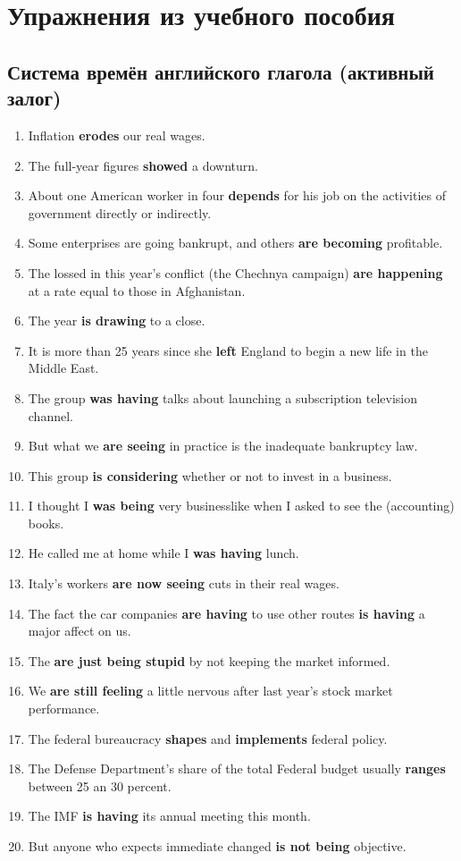 \documentclass[main.tex]{subfiles}
\begin{document}
\setcounter{secnumdepth}{0}

\section{Упражнения из учебного пособия}

\subsection{Система времён английского глагола (активный залог)}


\begin{enumerate}[nosep,leftmargin=*]
	\item Inflation \textbf{erodes} our real wages.
	\item The full-year figures \textbf{showed} a downturn.
	\item About one American worker in four \textbf{depends} for his job on the activities of government directly or indirectly.
	\item Some enterprises are going bankrupt, and others \textbf{are becoming} profitable.
	\item The lossed in this year's conflict (the Chechnya campaign) \textbf{are happening} at a rate equal to those in Afghanistan.
	\item The year \textbf{is drawing} to a close.
	\item It is more than 25 years since she \textbf{left} England to begin a new life in the Middle East.
	\item The group \textbf{was having} talks about launching a subscription television channel.
	\item But what we \textbf{are seeing} in practice is the inadequate bankruptcy law.
	\item This group \textbf{is considering} whether or not to invest in a business.
	\item I thought I \textbf{was being} very businesslike when I asked to see the (accounting) books.
	\item He called me at home while I \textbf{was having} lunch.
	\item Italy's workers \textbf{are now seeing} cuts in their real wages.
	\item The fact the car companies \textbf{are having} to use other routes \textbf{is having} a major affect on us.
	\item The \textbf{are just being stupid} by not keeping the market informed.
	\item We \textbf{are still feeling} a little nervous after last year's stock market performance.
	\item The federal bureaucracy \textbf{shapes} and \textbf{implements} federal policy.
	\item The Defense Department's share of the total Federal budget usually \textbf{ranges} between 25 an 30 percent.
	\item The IMF \textbf{is having} its annual meeting this month.
	\item But anyone who expects immediate changed \textbf{is not being} objective.
\end{enumerate}
\end{document}
